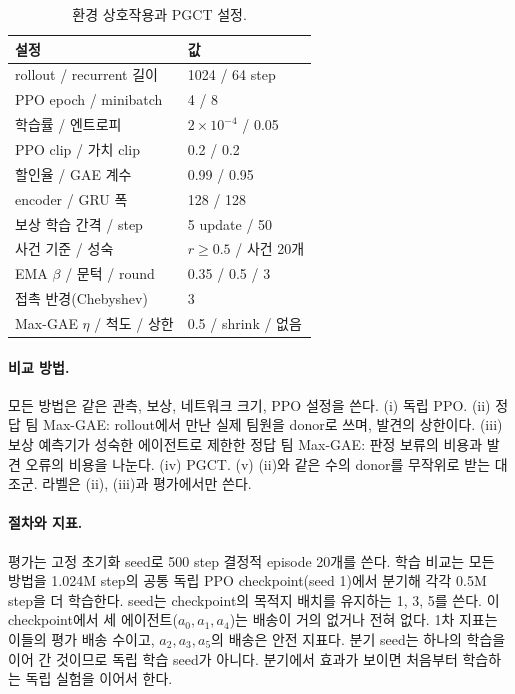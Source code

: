 \documentclass[10pt,twocolumn,letterpaper]{article}
\begin{document}
\begin{table}[t]\centering\small
\begin{tabular}{ll}\toprule
설정 & 값\\\midrule
rollout / recurrent 길이 & 1024 / 64 step\\
PPO epoch / minibatch & 4 / 8\\
학습률 / 엔트로피 & $2\times10^{-4}$ / 0.05\\
PPO clip / 가치 clip & 0.2 / 0.2\\
할인율 / GAE 계수 & 0.99 / 0.95\\
encoder / GRU 폭 & 128 / 128\\
보상 학습 간격 / step & 5 update / 50\\
사건 기준 / 성숙 & $r\ge0.5$ / 사건 20개\\
EMA $\beta$ / 문턱 / round & 0.35 / 0.5 / 3\\
접촉 반경(Chebyshev) & 3\\
Max-GAE $\eta$ / 척도 / 상한 & 0.5 / shrink / 없음\\\bottomrule
\end{tabular}
\caption{환경 상호작용과 PGCT 설정.}\label{tab:settings}
\end{table}

\paragraph{비교 방법.} 모든 방법은 같은 관측, 보상, 네트워크 크기, PPO 설정을 쓴다. (i) 독립 PPO. (ii) 정답 팀 Max-GAE: rollout에서 만난 실제 팀원을 donor로 쓰며, 발견의 상한이다. (iii) 보상 예측기가 성숙한 에이전트로 제한한 정답 팀 Max-GAE: 판정 보류의 비용과 발견 오류의 비용을 나눈다. (iv) PGCT. (v) (ii)와 같은 수의 donor를 무작위로 받는 대조군. 라벨은 (ii), (iii)과 평가에서만 쓴다.

\paragraph{절차와 지표.} 평가는 고정 초기화 seed로 500 step 결정적 episode 20개를 쓴다. 학습 비교는 모든 방법을 1.024M step의 공통 독립 PPO checkpoint(seed 1)에서 분기해 각각 0.5M step을 더 학습한다. seed는 checkpoint의 목적지 배치를 유지하는 1, 3, 5를 쓴다. 이 checkpoint에서 세 에이전트($a_0,a_1,a_4$)는 배송이 거의 없거나 전혀 없다. 1차 지표는 이들의 평가 배송 수이고, $a_2,a_3,a_5$의 배송은 안전 지표다. 분기 seed는 하나의 학습을 이어 간 것이므로 독립 학습 seed가 아니다. 분기에서 효과가 보이면 처음부터 학습하는 독립 실험을 이어서 한다.
\end{document}
